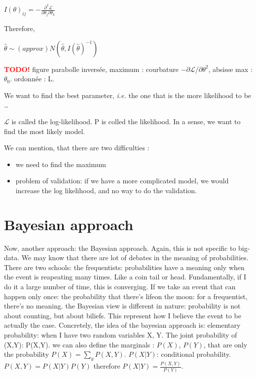 \documentclass[a4paper]{tufte-book}
\newcommand{\hairsp}{\hspace{1pt}}%
\newcommand{\TODO}{\textcolor{red}{\bf TODO!}\xspace}
\newcommand{\ie}{\textit{i.\hairsp{}e.}\xspace}
\begin{document}
$I(\theta)_{ij} = - \frac{\partial^2 \mathcal{L}}{\partial \theta_j \partial\theta_k}$

Therefore,

$\hat\theta \sim (approx) N(\hat\theta, I(\hat\theta)^{-1})$

\begin{marginfigure}
\TODO
figure parabolle inversée, maximum : courbature $-\partial\mathcal L/\partial \theta^2$, absisse max : $\theta_0$. ordonnée : L.
\end{marginfigure}

We want to find the best parameter, \ie the one that is the more likelihood to be \ldots

$\mathcal{L}$ is called the log-likelihood. P is colled the likelihood.
In a sense, we want to find the most likely model.

We can mention, that there are two difficulties :
\begin{itemize}
\item we need to find the maximum
\item problem of validation: if we have a more complicated model, we would increase the log likelihood, and no way to do the validation.
\end{itemize}

\section{Bayesian approach}

Now, another approach: the Bayesian approach. Again, this is not specific to big-data.
We may know that there are lot of debates in the meaning of probabilities. There
are two schools: the frequentists: probabilities have a meaning only when the
event is reapeating many times. Like a coin tail or head. Fundamentally, if I do
it a large number of time, this is converging.
If we take an event that can happen only once: the probability that there's lifeon the moon: for a frequentist, there's no meaning.
the Bayesian view is different in nature: probability is not about counting, but
about biliefs. This represent how I believe the event to be actually the case.
Concretely, the idea of the bayesian approach is:
elementary probability: when I have two random variables X, Y.
The joint probability of (X,Y): P(X,Y). we can also define the marginals :
$P(X)$, $P(Y)$, that are only the probability $P(X) = \sum_y P(X,Y)$.
$P(X|Y)$: conditional probability.
$P(X,Y) = P(X|Y)P(Y)$
therefore $P(X|Y) = \frac{P(X,Y)}{P(Y)}$.
\end{document}
